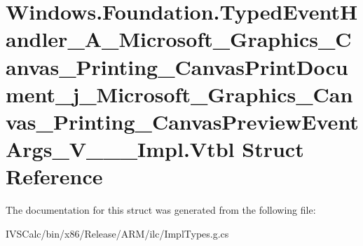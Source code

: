\hypertarget{struct_windows_1_1_foundation_1_1_typed_event_handler___a___microsoft___graphics___canvas___prine6e3700127d414a75995e9900e9af76f}{}\section{Windows.\+Foundation.\+Typed\+Event\+Handler\+\_\+\+A\+\_\+\+Microsoft\+\_\+\+Graphics\+\_\+\+Canvas\+\_\+\+Printing\+\_\+\+Canvas\+Print\+Document\+\_\+j\+\_\+\+Microsoft\+\_\+\+Graphics\+\_\+\+Canvas\+\_\+\+Printing\+\_\+\+Canvas\+Preview\+Event\+Args\+\_\+\+V\+\_\+\+\_\+\+\_\+\+Impl.\+Vtbl Struct Reference}
\label{struct_windows_1_1_foundation_1_1_typed_event_handler___a___microsoft___graphics___canvas___prine6e3700127d414a75995e9900e9af76f}


The documentation for this struct was generated from the following file\+:\begin{DoxyCompactItemize}
\item 
I\+V\+S\+Calc/bin/x86/\+Release/\+A\+R\+M/ilc/Impl\+Types.\+g.\+cs\end{DoxyCompactItemize}
